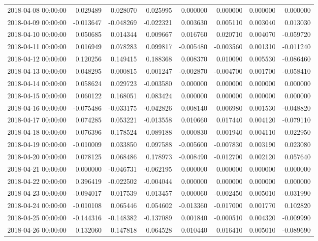 \begin{tabular}{lrrrrrrr}
2018-04-08 00:00:00 & 0.029489 & 0.028070 & 0.025995 & 0.000000 & 0.000000 & 0.000000 & 0.000000 \\
2018-04-09 00:00:00 & -0.013647 & -0.048269 & -0.022321 & 0.003630 & 0.005110 & 0.003040 & 0.013030 \\
2018-04-10 00:00:00 & 0.050685 & 0.014344 & 0.009667 & 0.016760 & 0.020710 & 0.004070 & -0.059720 \\
2018-04-11 00:00:00 & 0.016949 & 0.078283 & 0.099817 & -0.005480 & -0.003560 & 0.001310 & -0.011240 \\
2018-04-12 00:00:00 & 0.120256 & 0.149415 & 0.188368 & 0.008370 & 0.010090 & 0.005530 & -0.086460 \\
2018-04-13 00:00:00 & 0.048295 & 0.000815 & 0.001247 & -0.002870 & -0.004700 & 0.001700 & -0.058410 \\
2018-04-14 00:00:00 & 0.058624 & 0.029723 & -0.003580 & 0.000000 & 0.000000 & 0.000000 & 0.000000 \\
2018-04-15 00:00:00 & 0.060122 & 0.168051 & 0.083424 & 0.000000 & 0.000000 & 0.000000 & 0.000000 \\
2018-04-16 00:00:00 & -0.075486 & -0.033175 & -0.042826 & 0.008140 & 0.006980 & 0.001530 & -0.048820 \\
2018-04-17 00:00:00 & 0.074285 & 0.053221 & -0.013558 & 0.010660 & 0.017440 & 0.004120 & -0.079110 \\
2018-04-18 00:00:00 & 0.076396 & 0.178524 & 0.089188 & 0.000830 & 0.001940 & 0.004110 & 0.022950 \\
2018-04-19 00:00:00 & -0.010009 & 0.033850 & 0.097588 & -0.005600 & -0.007830 & 0.003190 & 0.023080 \\
2018-04-20 00:00:00 & 0.078125 & 0.068486 & 0.178973 & -0.008490 & -0.012700 & 0.002120 & 0.057640 \\
2018-04-21 00:00:00 & 0.000000 & -0.046731 & -0.062195 & 0.000000 & 0.000000 & 0.000000 & 0.000000 \\
2018-04-22 00:00:00 & 0.396419 & -0.022502 & -0.004044 & 0.000000 & 0.000000 & 0.000000 & 0.000000 \\
2018-04-23 00:00:00 & -0.094017 & 0.017539 & 0.013457 & 0.000060 & -0.002450 & 0.005010 & -0.031990 \\
2018-04-24 00:00:00 & -0.010108 & 0.065446 & 0.054602 & -0.013360 & -0.017000 & 0.001770 & 0.102820 \\
2018-04-25 00:00:00 & -0.144316 & -0.148382 & -0.137089 & 0.001840 & -0.000510 & 0.004320 & -0.009990 \\
2018-04-26 00:00:00 & 0.132060 & 0.147818 & 0.064528 & 0.010440 & 0.016410 & 0.005010 & -0.089690 \\

\end{tabular}
